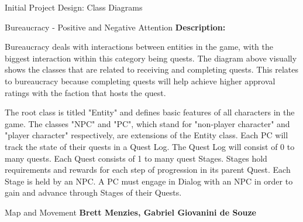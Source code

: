 \documentclass[12pt]{report}
\begin{document}
\begin{chapter}{Initial Project Design: Class Diagrams}
\begin{section}{Bureaucracy - Positive and Negative Attention}
    \textbf{Description:}

    Bureaucracy deals with interactions between entities in the game, with the biggest interaction within this category being quests. The diagram above visually shows the classes that are related to receiving and completing quests. This relates to bureaucracy because completing quests will help achieve higher approval ratings with the faction that hosts the quest.

    The root class is titled "Entity" and defines basic features of all characters in the game.
    The classes "NPC" and "PC", which stand for "non-player character" and "player character" respectively, are extensions of the Entity class. 
    Each PC will track the state of their quests in a Quest Log. 
    The Quest Log will consist of 0 to many quests.
    Each Quest consists of 1 to many quest Stages.
    Stages hold requirements and rewards for each step of progression in its parent Quest.
    Each Stage is held by an NPC.
    A PC must engage in Dialog with an NPC in order to gain and advance through Stages of their Quests.
\end{section}

\begin{section}{Map and Movement}
    \textbf{Brett Menzies, Gabriel Giovanini de Souze}


\end{section}
\end{chapter}
\end{document}
